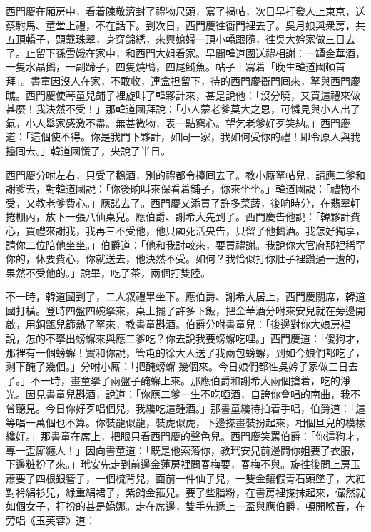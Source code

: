 西門慶在廂房中，看着陳敬濟封了禮物尺頭，寫了揭帖，次日早打發人上東京，送蔡駙馬、童堂上禮，不在話下。到次日，西門慶徃衙門裡去了。吳月娘與衆房，共五頂轎子，頭戴珠翠，身穿錦綉，來興媳婦一頂小轎跟隨，徃吳大妗家做三日去了。止留下孫雪娥在家中，和西門大姐看家。早間韓道國送禮相謝：一罈金華酒，一隻水晶鵝，一副蹄子，四隻燒鴨，四尾鰣魚。帖子上寫着「晚生韓道國頓首拜」。書童因沒人在家，不敢收，連盒担留下，待的西門慶衙門囘來，拏與西門慶瞧。西門慶使琴童兒鋪子裡旋叫了韓夥計來，甚是說他：「沒分曉，又買這禮來做甚麼！我決然不受！」那韓道國拜說：「小人蒙老爹莫大之恩，可憐見與小人出了氣，小人舉家感激不盡。無甚微物，表一點窮心。望乞老爹好歹笑納。」西門慶道：「這個使不得。你是我門下夥計，如同一家，我如何受你的禮！即令原人與我擡囘去。」韓道國慌了，央說了半日。

西門慶分咐左右，只受了鵝酒，別的禮都令擡囘去了。教小厮拏帖兒，請應二爹和謝爹去，對韓道國說：「你後晌叫來保看着鋪子，你來坐坐。」韓道國說：「禮物不受，又教老爹費心。」應諾去了。西門慶又添買了許多菜蔬，後晌時分，在翡翠軒捲棚內，放下一張八仙桌兒。應伯爵、謝希大先到了。西門慶告他說：「韓夥計費心，買禮來謝我，我再三不受他，他只顧死活央告，只留了他鵝酒。我怎好獨享，請你二位陪他坐坐。」伯爵道：「他和我討較來，要買禮謝。我說你大官府那裡稀罕你的，休要費心，你就送去，他決然不受。如何？我恰似打你肚子裡鑽過一遭的，果然不受他的。」說畢，吃了茶，兩個打雙陸。

不一時，韓道國到了，二人叙禮畢坐下。應伯爵、謝希大居上，西門慶關席，韓道國打橫。登時四盤四碗拏來，桌上擺了許多下飯，把金華酒分咐來安兒就在旁邊開啟，用銅甑兒篩熱了拏來，教書童斟酒。伯爵分咐書童兒：「後邊對你大娘房裡說，怎的不拏出螃蠏來與應二爹吃？你去說我要螃蠏吃哩。」西門慶道：「傻狗才，那裡有一個螃蠏！實和你說，管屯的徐大人送了我兩包螃蠏，到如今娘們都吃了，剩下醃了幾個。」分咐小厮：「把醃螃蠏𢵞幾個來。今日娘們都徃吳妗子家做三日去了。」不一時，畫童拏了兩盤子醃蠏上來。那應伯爵和謝希大兩個搶着，吃的淨光。因見書童兒斟酒，說道：「你應二爹一生不吃啞酒，自誇你會唱的南曲，我不曾聽見。今日你好歹唱個兒，我纔吃這鍾酒。」那書童纔待拍着手唱，伯爵道：「這等唱一萬個也不算。你裝龍似龍，裝虎似虎，下邊搽畫裝扮起來，相個旦兒的模樣纔好。」{}那書童在席上，把眼只看西門慶的聲色兒。西門慶笑罵伯爵：「你這狗才，專一歪厮纏人！」因向書童道：「既是他索落你，教玳安兒前邊問你姐要了衣服，下邊粧扮了來。」玳安先走到前邊金蓮房裡問春梅要，春梅不與。旋徃後問上房玉蕭要了四根銀簪子，一個梳背兒，面前一件仙子兒，一雙金鑲假青石頭墜子，大紅對衿絹衫兒，綠重絹裙子，紫銷金箍兒。要了些脂粉，在書房裡搽抹起來，儼然就如個女子，打扮的甚是嬌娜。走在席邊，雙手先遞上一盃與應伯爵，頓開喉音，在旁唱《玉芙蓉》道：

